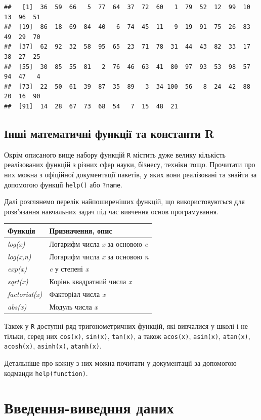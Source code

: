 \documentclass[
]{book}
\begin{document}
\begin{verbatim}
##   [1]  36  59  66   5  77  64  37  72  60   1  79  52  12  99  10  13  96  51
##  [19]  86  18  69  84  40   6  74  45  11   9  19  91  75  26  83  49  29  70
##  [37]  62  92  32  58  95  65  23  71  78  31  44  43  82  33  17  38  27  25
##  [55]  30  85  55  81   2  76  46  63  41  80  97  93  53  98  57  94  47   4
##  [73]  22  50  61  39  87  35  89   3  34 100  56   8  24  42  88  20  16  90
##  [91]  14  28  67  73  68  54   7  15  48  21
\end{verbatim}

\hypertarget{chapter244}{%
\subsection{Інші математичні функції та константи R}\label{chapter244}}

Окрім описаного вище набору функцій \texttt{R} містить дуже велику кількість реалізованих функцій з різних сфер науки, бізнесу, техніки тощо. Прочитати про них можна з офіційної документації пакетів, у яких вони реалізовані та знайти за допомогою функції \texttt{help()} або \texttt{?name}.

Далі розглянемо перелік найпоширеніших функцій, що використовуються для розв'язання навчальних задач під час вивчення основ програмування.

\begin{longtable}[]{@{}ll@{}}
\toprule
Функція & Призначення, опис\tabularnewline
\midrule
\endhead
\emph{log(x)} & Логарифм числа \emph{x} за основою \emph{e}\tabularnewline
\emph{log(x,n)} & Логарифм числа \emph{x} за основою \emph{n}\tabularnewline
\emph{exp(x)} & \emph{e} у степені \emph{x}\tabularnewline
\emph{sqrt(x)} & Корінь квадратний числа \emph{x}\tabularnewline
\emph{factorial(x)} & Факторіал числа \emph{x}\tabularnewline
\emph{abs(x)} & Модуль числа \emph{x}\tabularnewline
\bottomrule
\end{longtable}

Також у \texttt{R} доступні ряд тригонометричних функцій, які вивчалися у школі і не тільки, серед них \texttt{cos(x)}, \texttt{sin(x)}, \texttt{tan(x)}, а також \texttt{acos(x)}, \texttt{asin(x)}, \texttt{atan(x)}, \texttt{acosh(x)}, \texttt{asinh(x)}, \texttt{atanh(x)}.

Детальніше про кожну з них можна почитати у документації за допомогою кодманди \texttt{help(function)}.

\hypertarget{chapter245}{%
\section{Введення-виведння даних}\label{chapter245}}
\end{document}
